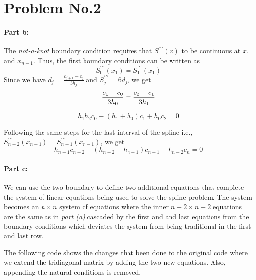 \section*{Problem No.2} \label{sec:prob2}

\paragraph{Part b:}  The \emph{not-a-knot} boundary condition requires that $S^{\prime \prime \prime}(x)$ to be continuous at $x_{1}$ and $x_{n-1}$. Thus, the first boundary conditions can be written as 
\[
S^{\prime \prime \prime}_{0}(x_{1}) =  S^{\prime \prime \prime}_{1}(x_{1})
\]
Since we have $d_{j} = \frac{c_{j+1}-c_{j}}{3h_{j}}$ and $S^{\prime \prime \prime}_j = 6d_{j}$, we get
\[
\frac{c_{1}-c_{0}}{3h_{0}} = \frac{c_{2}-c_{1}}{3h_{1}}\\
\]

\begin{equation}
h_{1}h_{2}c_{0} - (h_{1}+h_{0})c_{1} + h_{0}c_{2} =0
\label{eq1}
\end{equation}

Following the same steps for the last interval of the spline i.e., $S^{\prime \prime \prime}_{n-2}(x_{n-1}) =  S^{\prime \prime \prime}_{n-1}(x_{n-1})$, we get 
\begin{equation}
h_{n-1}c_{n-2}-(h_{n-2}+h_{n-1})c_{n-1} + h_{n-2}c_{n}=0
\label{eq2}
\end{equation}


\paragraph{Part c:} We can use the two boundary to define two additional equations that complete the system of linear equations being used to solve the spline problem. The system becomes an $n \times n$ system of equations where the inner $n-2 \times n-2$ equations are the same as in \emph{part (a)} cascaded by the first and and last equations from the boundary conditions which deviates the system from being traditional in the first and last row. 

The following code shows the changes that been done to the original code where we extend the tridiagonal matrix by adding the two new equations. Also, appending the natural conditions is removed.  

